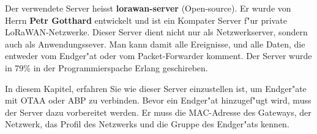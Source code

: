 Der verwendete Server heisst \textbf{lorawan-server} (Open-source). Er
wurde von Herrn \textbf{Petr Gotthard} \cite{server} entwickelt und ist
ein Kompater Server f"ur private LoRaWAN-Netzwerke. Dieser Server dient
nicht nur als Netzwerkserver, sondern auch als Anwendungssever. Man kann
damit alle Ereignisse, und alle Daten, die entweder vom Endger"at oder
vom Packet-Forwarder komment. Der Server wurde in 79\% in der
Programmierspache Erlang \cite{erlang} geschireben.   

In diesem Kapitel, erfahren Sie wie dieser Server einzustellen ist, um
Endger"ate mit OTAA oder ABP zu verbinden. Bevor ein Endger"at
hinzugef"ugt wird, muss der Server dazu vorbereitet werden. Er muss die
MAC-Adresse des Gateways, der Netzwerk, das Profil des Netzwerks und die
Gruppe des Endger"ats kennen. 


